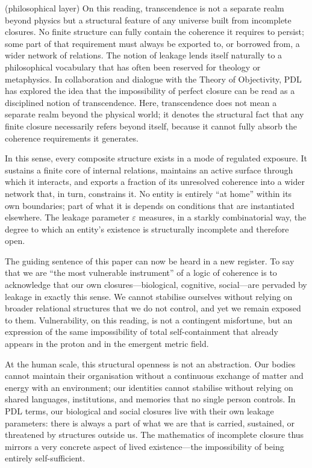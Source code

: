 \documentclass[11pt,a4paper]{article}
\theoremstyle{definition}
\begin{document}
(philosophical layer) On this reading, transcendence is not a separate realm beyond physics but a structural feature of any universe built from incomplete closures. No finite structure can fully contain the coherence it requires to persist; some part of that requirement must always be exported to, or borrowed from, a wider network of relations. The notion of leakage lends itself naturally to a philosophical vocabulary that has often been reserved for theology or metaphysics. In collaboration and dialogue with the Theory of Objectivity, PDL has explored the idea that the impossibility of perfect closure can be read as a disciplined notion of transcendence.\cite{Laubscher_PDL_TO_Dialogue_2024,Laubscher_Existence_PulsatingClosure_2026} Here, transcendence does not mean a separate realm beyond the physical world; it denotes the structural fact that any finite closure necessarily refers beyond itself, because it cannot fully absorb the coherence requirements it generates.

In this sense, every composite structure exists in a mode of regulated exposure. It sustains a finite core of internal relations, maintains an active surface through which it interacts, and exports a fraction of its unresolved coherence into a wider network that, in turn, constrains it.\cite{Laubscher_ProtonArch_v2_2024,Laubscher_UniversalCoherenceLeakage_2024} No entity is entirely ``at home'' within its own boundaries; part of what it is depends on conditions that are instantiated elsewhere. The leakage parameter \(\varepsilon\) measures, in a starkly combinatorial way, the degree to which an entity’s existence is structurally incomplete and therefore open.

The guiding sentence of this paper can now be heard in a new register. To say that we are ``the most vulnerable instrument'' of a logic of coherence is to acknowledge that our own closures---biological, cognitive, social---are pervaded by leakage in exactly this sense.\cite{Laubscher_Existence_PulsatingClosure_2026} We cannot stabilise ourselves without relying on broader relational structures that we do not control, and yet we remain exposed to them. Vulnerability, on this reading, is not a contingent misfortune, but an expression of the same impossibility of total self-containment that already appears in the proton and in the emergent metric field. 

At the human scale, this structural openness is not an abstraction. Our bodies cannot maintain their organisation without a continuous exchange of matter and energy with an environment; our identities cannot stabilise without relying on shared languages, institutions, and memories that no single person controls. In PDL terms, our biological and social closures live with their own leakage parameters: there is always a part of what we are that is carried, sustained, or threatened by structures outside us. The mathematics of incomplete closure thus mirrors a very concrete aspect of lived existence—the impossibility of being entirely self-sufficient.
\end{document}
